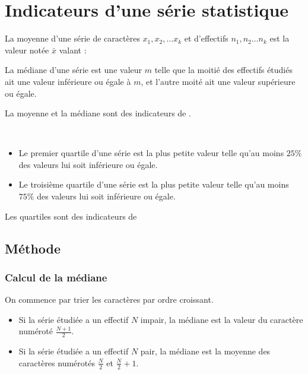 \documentclass{article}
\begin{document}
\thispagestyle{empty}

\setcounter{nth-gaps}{1}
\setcounter{section}{2}

\section{Indicateurs d'une série statistique}

\begin{definition}[Moyenne]
  La moyenne d'une série de caractères $x_1, x_2, \ldots x_k$ et d'effectifs $n_1, n_2 \ldots n_k$ est la valeur notée $\bar x$ valant :

\end{definition}

\begin{definition}[Médiane]
  La médiane d'une série est une valeur $m$ telle que la moitié des effectifs étudiés ait une valeur inférieure ou égale à $m$, et l'autre moité ait une valeur supérieure ou égale.
\end{definition}

\begin{remarque}
  La moyenne et la médiane sont des indicateurs de .
\end{remarque}

\begin{definition}[Quartiles]~
  \begin{itemize}
    \item Le premier quartile d'une série est la plus petite valeur telle qu'au moins $25\%$ des valeurs lui soit inférieure ou égale.
    \item Le troisième quartile d'une série est la plus petite valeur telle qu'au moins $75\%$ des valeurs lui soit inférieure ou égale.
  \end{itemize}
\end{definition}

\begin{remarque}
  Les quartiles sont des indicateurs de 
\end{remarque}

\subsection*{Méthode}
\subsubsection*{Calcul de la médiane}
On commence par trier les caractères par ordre croissant.
\begin{itemize}
  \item Si la série étudiée a un effectif $N$ impair, la médiane est la valeur du caractère numéroté $\frac{N+1}{2}$.
  \item Si la série étudiée a un effectif $N$ pair, la médiane est la moyenne des caractères numérotés $\frac{N}{2}$ et $\frac{N}{2}+1$.
\end{itemize}
\end{document}
